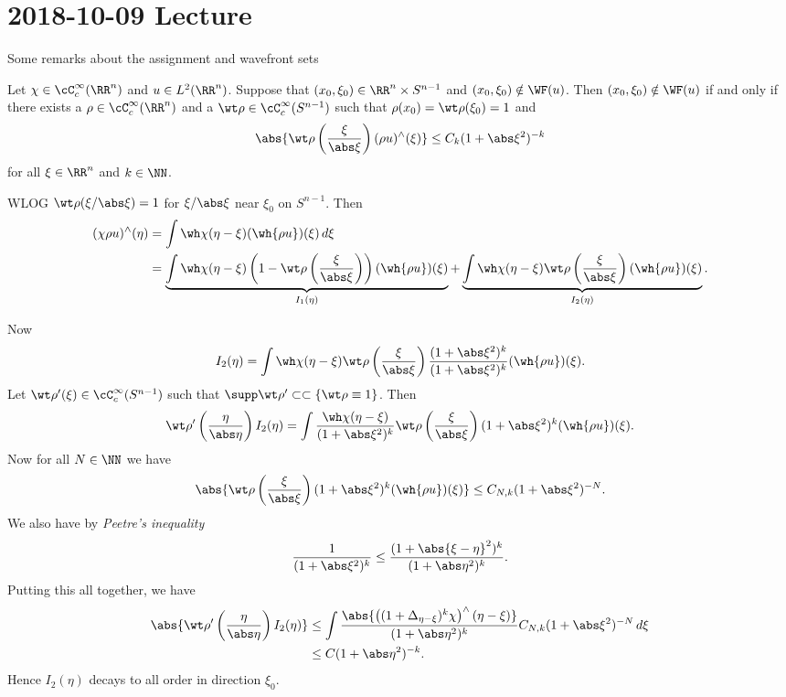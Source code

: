 \section{2018-10-09 Lecture}

Some remarks about the assignment and wavefront sets

Let $\chi\in\cC_c^\infty(\RR^n)$ and $u\in L^2(\RR^n)$.
Suppose that $(x_0,\xi_0)\in\RR^n\times S^{n-1}$ and $(x_0,\xi_0)\notin\WF(u)$.
Then $(x_0,\xi_0)\notin\WF(u)$ if and only if there exists a $\rho\in\cC_c^\infty(\RR^n)$ and a $\wt\rho\in\cC_c^\infty(S^{n-1})$ such that $\rho(x_0)=\wt\rho(\xi_0)=1$ and
\[ \abs{\wt\rho\left( \frac\xi{\abs\xi} \right) (\rho u)^\wedge(\xi) } \leq C_k(1+\abs\xi^2)^{-k} \]
for all $\xi\in\RR^n$ and $k\in\NN$.

WLOG $\wt\rho(\xi/\abs\xi)=1$ for $\xi/\abs\xi$ near $\xi_0$ on $S^{n-1}$.
Then
\begin{align*}
  (\chi\rho u)^\wedge(\eta) &= \int \wh\chi(\eta-\xi) (\wh{\rho u})(\xi) \, d\xi \\
  &= \underbrace{\int \wh\chi(\eta-\xi) \left( 1-\wt\rho\left( \frac\xi{\abs\xi} \right) \right) (\wh{\rho u})(\xi)}_{I_1(\eta)} + \underbrace{\int \wh\chi(\eta-\xi) \wt\rho\left( \frac\xi{\abs\xi} \right) (\wh{\rho u})(\xi)}_{I_2(\eta)}.
\end{align*}

Now
\begin{equation*}
  I_2(\eta) = \int \wh\chi(\eta-\xi) \wt\rho\left( \frac\xi{\abs\xi} \right) \frac{(1+\abs\xi^2)^k}{(1+\abs\xi^2)^k} (\wh{\rho u})(\xi).
\end{equation*}
Let $\wt\rho'(\xi)\in\cC_c^\infty(S^{n-1})$ such that $\supp\wt\rho'\subset\subset\left\{ \wt\rho\equiv1 \right\}$.
Then
\begin{equation*}
  \wt\rho'\left( \frac{\eta}{\abs\eta} \right) I_2(\eta) = \int \frac{\wh\chi(\eta-\xi)}{(1+\abs\xi^2)^k} \wt\rho\left( \frac\xi{\abs\xi} \right) (1+\abs\xi^2)^k (\wh{\rho u})(\xi).
\end{equation*}
Now for all $N\in\NN$ we have
\begin{equation*}
  \abs{\wt\rho\left( \frac\xi{\abs\xi} \right) (1+\abs\xi^2)^k (\wh{\rho u})(\xi)} \leq C_{N,k}(1+\abs\xi^2)^{-N}.
\end{equation*}
We also have by \emph{Peetre's inequality}
\begin{equation*}
  \frac1{(1+\abs\xi^2)^k} \leq \frac{(1+\abs{\xi-\eta}^2)^k}{(1+\abs\eta^2)^k}.
\end{equation*}
Putting this all together, we have
\begin{align*}
  \abs{ \wt\rho'\left( \frac{\eta}{\abs\eta} \right) I_2(\eta) } &\leq \int \frac{\abs{\left( (1+\Delta_{\eta-\xi})^k\chi \right)^\wedge(\eta-\xi)}}{(1+\abs\eta^2)^k} C_{N,k} (1+\abs\xi^2)^{-N} \, d\xi \\
  &\leq C(1+\abs\eta^2)^{-k}.
\end{align*}
Hence $I_2(\eta)$ decays to all order in direction $\xi_0$.

